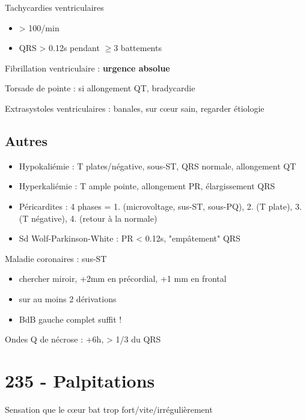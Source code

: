 Tachycardies ventriculaires
\begin{itemize}
  \item > 100/min
  \item QRS > 0.12s pendant $\ge 3$ battements
\end{itemize}
Fibrillation ventriculaire : \textbf{urgence absolue}  \skull

Torsade de pointe : si allongement QT, bradycardie

Extrasystoles ventriculaires : banales, sur c\oe{}ur sain, regarder étiologie

\subsection{Autres}
\begin{itemize}
  \item Hypokaliémie : T plates/négative, sous-ST, QRS normale, allongement QT
  \item Hyperkaliémie : T ample pointe, allongement PR, élargissement QRS
  \item Péricardites : 4 phases = 1. (microvoltage, sus-ST, sous-PQ), 2. (T plate), 3. (T
    négative), 4. (retour à la normale)
  \item Sd Wolf-Parkinson-White : PR < 0.12s, "empâtement" QRS
\end{itemize}

Maladie coronaires : sus-ST
\begin{itemize}
  \item chercher miroir, +2mm en précordial, +1 mm en frontal
  \item sur au moins 2 dérivations
  \item BdB gauche complet suffit !
\end{itemize}
Ondes Q de nécrose : +6h, > 1/3 du QRS

\section{235 - Palpitations}%
\label{sec:235_palpitations}
Sensation que le c\oe{}ur bat trop fort/vite/irrégulièrement

